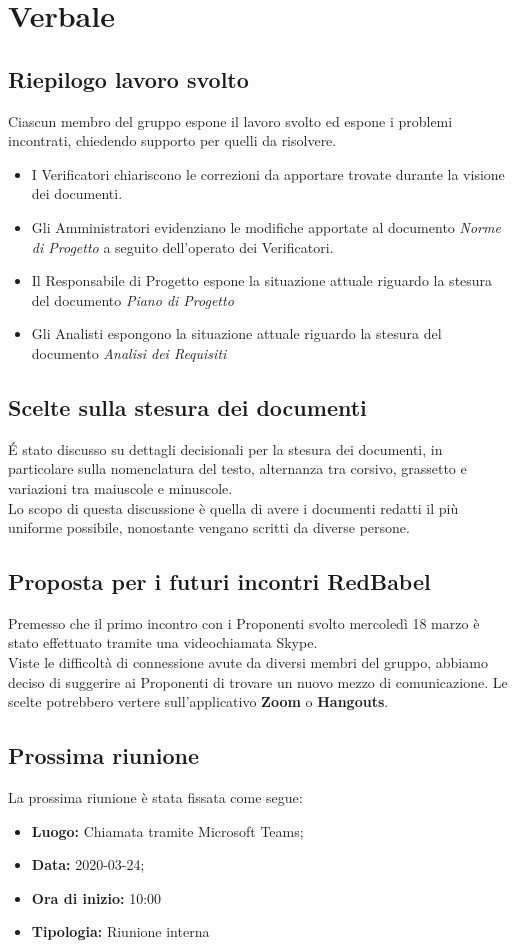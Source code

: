 \section{Verbale}
	
	\subsection{Riepilogo lavoro svolto}
		Ciascun membro del gruppo espone il lavoro svolto ed espone i problemi incontrati, chiedendo supporto per quelli da risolvere.
		\begin{itemize}
			\item I Verificatori chiariscono le correzioni da apportare trovate durante la visione dei documenti.
			\item Gli Amministratori evidenziano le modifiche apportate al documento \textit{Norme di Progetto} a seguito dell'operato dei Verificatori.
			\item Il Responsabile di Progetto espone la situazione attuale riguardo la stesura del documento \textit{Piano di Progetto}
			\item Gli Analisti espongono la situazione attuale riguardo la stesura del documento \textit{Analisi dei Requisiti}
		\end{itemize}
		
		
	\subsection{Scelte sulla stesura dei documenti}
		\'E stato discusso su dettagli decisionali per la stesura dei documenti, in particolare sulla nomenclatura del testo, alternanza tra corsivo, grassetto e variazioni tra maiuscole e minuscole.\\
		Lo scopo di questa discussione è quella di avere i documenti redatti il più uniforme possibile, nonostante vengano scritti da diverse persone.
		
		
	\subsection{Proposta per i futuri incontri RedBabel}
		Premesso che il primo incontro con i Proponenti svolto mercoledì 18 marzo è stato effettuato tramite una videochiamata Skype.\\
		Viste le difficoltà di connessione avute da diversi membri del gruppo, abbiamo deciso di suggerire ai Proponenti di trovare un nuovo mezzo di comunicazione. Le scelte potrebbero vertere sull'applicativo \textbf{Zoom} o \textbf{Hangouts}.


	\subsection{Prossima riunione}
		La prossima riunione è stata fissata come segue: 
		\begin{itemize}
			\item \textbf{Luogo: } Chiamata tramite Microsoft Teams; 
			\item \textbf{Data: } 2020-03-24; 
			\item \textbf{Ora di inizio: } 10:00
			\item \textbf{Tipologia: } Riunione interna
		\end{itemize}